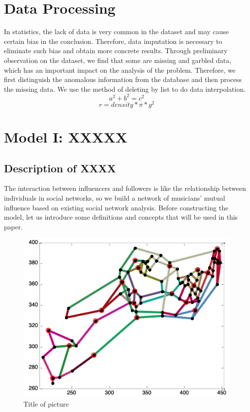 \documentclass[12pt]{article}
\begin{document}
\section{Data Processing}
In statistics, the lack of data is very common in the dataset and may cause certain bias in the conclusion. Therefore, data imputation is necessary to eliminate such bias and obtain more concrete results. Through preliminary observation on the dataset, we find that some are missing and garbled data, which has an important impact on the analysis of the problem. Therefore, we first distinguish the anomalous information from the database and then process the missing data. We use the method of deleting by list to do data interpolation.
\begin{equation}
    a^2 + b^2 = c^2
    \end{equation}
    \begin{equation}
        r=density*\pi*g^2
        \end{equation}

\section{Model I: XXXXX}
\subsection{Description of XXXX}
The interaction between influencers and followers is like the relationship between individuals in social networks, so we build a network of musicians' mutual influence based on existing social network analysis. Before constructing the model, let us introduce some definitions and concepts that will be used in this paper. 

\begin{figure}[h]
\centering
\includegraphics{fig1.png}
\caption{Title of picture}
\end{figure}
\end{document}
